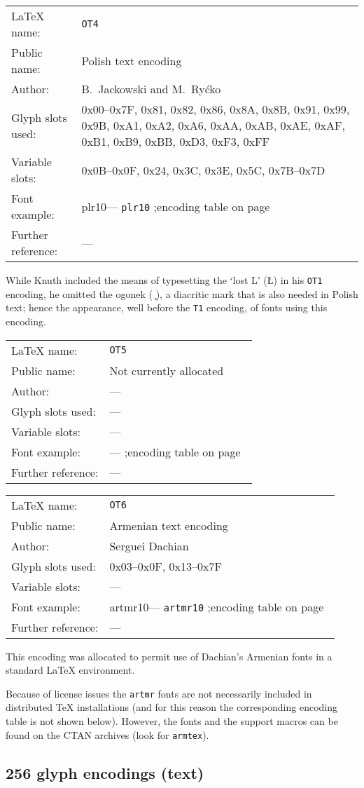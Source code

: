 \documentclass{ltxguide}[1994/11/20]
\makeatletter
\providecommand{\Enc}[1]{\texttt{#1}}
\newenvironment{encodinginfo}[7]%
  {\noindent
   \begin{tabularx}{\linewidth}{@{}l>{\raggedright\let\\\tabularnewline}X}%
     \LaTeX{} name:          & \texttt{#1}\\%
     Public name:          & #2\\%
     Author:                   & #3\\%
     Glyph slots used: & #4\\%
     Variable slots:     & #5\\%
     Font example:     & \def\@tempa{#6}\ifx\@tempa\@empty---%
                            \else\texttt{#6}\referenceftable{#6}\fi\\%
     Further reference:                & #7%
   \end{tabularx}%
   \par\nobreak
   \vspace*{3pt}%
   \quote
  }%
  {\endquote
   \vspace{6pt}}
\def\referenceftable#1{
  \@ifundefined{r@fonttable:#1}%
  \relax
  {;\space encoding table on page~\pageref{fonttable:#1}}%
}
\makeatother
\begin{document}
\begin{encodinginfo}{OT4}
        {Polish text encoding}
        {B.~Jackowski and M.~Ry\'cko} %
  {0x00--0x7F, 0x81, 0x82, 0x86, 0x8A, 0x8B, 0x91, 0x99, 0x9B, 0xA1,
   0xA2, 0xA6, 0xAA, 0xAB, 0xAE, 0xAF, 0xB1, 0xB9, 0xBB, 0xD3, 0xF3,
   0xFF}
  {0x0B--0x0F, 0x24, 0x3C, 0x3E, 0x5C, 0x7B--0x7D}
        {plr10}
        {---}

   While Knuth included the means of typesetting the `lost L' (\L) in
  his \Enc{OT1} encoding, he omitted the ogonek (\,\,\k{}), a diacritic
  mark that is also needed in Polish text; hence the appearance, well
  before the \Enc{T1} encoding, of fonts using this encoding.
\end{encodinginfo}

\begin{encodinginfo}{OT5}
        {Not currently allocated}
        {---}
        {---}
        {---}
        {}
        {---}

\end{encodinginfo}



\begin{encodinginfo}{OT6}
        {Armenian text encoding}
        {Serguei Dachian}
        {0x03--0x0F, 0x13--0x7F}
        {---}
        {artmr10}
        {---}

  This encoding was allocated to permit use of Dachian's
  Armenian fonts in a standard \LaTeX{} environment.

  Because of license issues the \texttt{artmr} fonts are not necessarily
  included in distributed \TeX{} installations (and for this reason the
  corresponding encoding table is not shown below). However, the fonts
  and the support macros can be found on the CTAN archives (look for
  \texttt{armtex}).

\end{encodinginfo}



\subsection{256 glyph encodings (text)}
\end{document}
